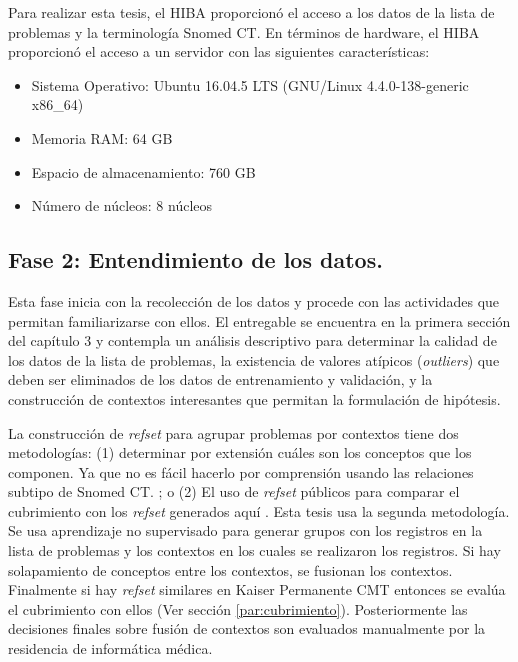 Para realizar esta tesis, el \acrshort{HIBA} proporcionó el acceso a los datos de la lista de problemas y la terminología Snomed CT. En términos de hardware, el \acrshort{HIBA} proporcionó el acceso a un servidor con las siguientes características:
\begin{itemize}
\item Sistema Operativo: Ubuntu 16.04.5 LTS (GNU/Linux 4.4.0-138-generic x86\_64)
\item Memoria RAM: 64 GB 
\item Espacio de almacenamiento: 760 GB
\item Número de núcleos: 8 núcleos
\end{itemize}

\subsection{Fase 2: Entendimiento de los datos.} \label{par:entendimiento_datos} Esta fase inicia con la recolección de los datos y procede con las actividades que permitan familiarizarse con ellos. El entregable se encuentra en la primera sección del capítulo 3 y contempla un análisis descriptivo para determinar la calidad de los datos de la lista de problemas, la existencia de valores atípicos (\textit{outliers})  que deben ser eliminados de los datos de entrenamiento y validación, y la construcción de contextos interesantes que permitan la formulación de hipótesis.

La construcción de  \textit{\acrshort{refset}} para agrupar problemas por contextos tiene dos metodologías: (1) determinar por extensión cuáles son los conceptos que los componen. Ya que no es fácil hacerlo por comprensión usando las relaciones subtipo de Snomed CT.  \cite{Hjen2014MethodsSets.,Lee2013AImplementations.}; o (2) El uso de \textit{\acrshort{refset}} públicos para comparar el cubrimiento  con los \textit{\acrshort{refset}} generados aquí \cite{Lee2013AImplementations.}. Esta tesis usa la segunda metodología. Se usa aprendizaje no supervisado para generar grupos con los registros en la lista de problemas y los contextos en los cuales se realizaron los registros.  Si hay solapamiento de conceptos entre los contextos, se fusionan los contextos. Finalmente si hay \textit{\acrshort{refset}} similares en Kaiser Permanente \acrshort{CMT} entonces se evalúa el cubrimiento con ellos (Ver sección \ref{par:cubrimiento}).  Posteriormente las decisiones finales sobre fusión de  contextos son evaluados manualmente por la residencia de informática médica.  

